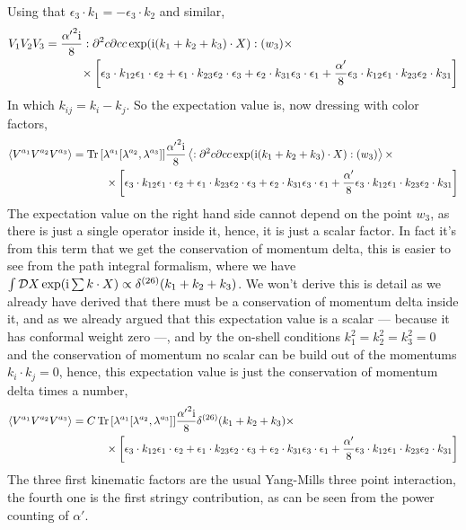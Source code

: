 Using that $\epsilon_3\cdot k_1=-\epsilon_3 \cdot k_2$ and similar,
\begin{align*}
    V_1V_2V_3&=\frac{{\alpha'}^2\textnormal{i}}{8}:{\partial^2 c\partial cc\exp(\textnormal{i}(k_1+k_2+ k_3)\cdot X)}:(w_3)\times\\
    &\quad\quad\quad\times\left[\epsilon_3\cdot k_{12}\epsilon_{1}\cdot\epsilon_{2}+\epsilon_{1}\cdot k_{23}\epsilon_{2}\cdot \epsilon_3+\epsilon_{2}\cdot k_{31}\epsilon_3\cdot\epsilon_{1}+\frac{\alpha'}{8}\epsilon_3\cdot k_{12}\epsilon_1\cdot k_{23}\epsilon_2\cdot k_{31}\right]\\
\end{align*}
In which $k_{ij}=k_i-k_j$. So the expectation value is, now dressing with color factors,
\begin{align*}
    \expval{V^{a_1}V^{a_2}V^{a_3}}&=\Tr\qty[\lambda^{a_1}\comm{\lambda^{a_2}}{\lambda^{a_3}}]\frac{{\alpha'}^2\im}{8}\expval{\cnord{{\partial^2 c\partial cc\exp(\im(k_1+k_2+ k_3)\cdot X)}}(w_3)}\times\\
    &\quad\quad\quad\times\left[\epsilon_3\cdot k_{12}\epsilon_{1}\cdot\epsilon_{2}+\epsilon_{1}\cdot k_{23}\epsilon_{2}\cdot \epsilon_3+\epsilon_{2}\cdot k_{31}\epsilon_3\cdot\epsilon_{1}+\frac{\alpha'}{8}\epsilon_3\cdot k_{12}\epsilon_1\cdot k_{23}\epsilon_2\cdot k_{31}\right]\\
\end{align*}
The expectation value on the right hand side cannot depend on the point $w_3$, as there is just a single operator inside it, hence, 
it is just a scalar factor. In fact it's from this term that we get the conservation of momentum delta, 
this is easier to see from the path integral formalism, where we have $\int\mathcal D X\exp(\textnormal{i} \sum k\cdot X)\propto \delta^{\qty(26)}\qty(k_1+k_2+k_3)$. 
We won't derive this is detail as we already have derived that there must be a conservation of momentum delta inside it, and as we already 
argued that this expectation value is a scalar --- because it has conformal weight zero ---, and by the on-shell conditions $k_1^2=k_2^2=k_3^2=0$ and the conservation of momentum 
no scalar can be build out of the momentums $k_i\cdot k_j=0$, hence, this expectation value is just the conservation of momentum delta 
times a number,
\begin{align*}
    \expval{V^{a_1}V^{a_2}V^{a_3}}&=C\Tr\qty[\lambda^{a_1}\comm{\lambda^{a_2}}{\lambda^{a_3}}]\frac{{\alpha'}^2\im}{8}\delta^{\qty(26)}\qty(k_1+k_2+k_3)\times\\
    &\quad\quad\quad\times\left[\epsilon_3\cdot k_{12}\epsilon_{1}\cdot\epsilon_{2}+\epsilon_{1}\cdot k_{23}\epsilon_{2}\cdot \epsilon_3+\epsilon_{2}\cdot k_{31}\epsilon_3\cdot\epsilon_{1}+\frac{\alpha'}{8}\epsilon_3\cdot k_{12}\epsilon_1\cdot k_{23}\epsilon_2\cdot k_{31}\right]\\
\end{align*}
The three first kinematic factors are the usual Yang-Mills three point interaction, the fourth one is the first stringy contribution, 
as can be seen from the power counting of $\alpha'$.


